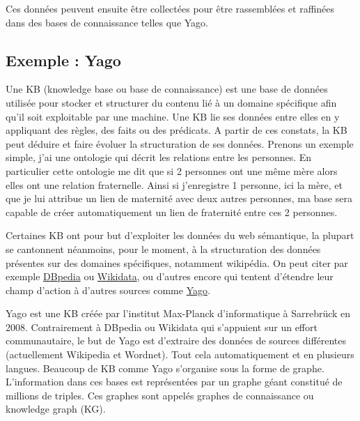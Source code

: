 Ces données peuvent ensuite être collectées pour être rassemblées et raffinées dans des bases de connaissance telles que Yago.

\subsection{Exemple : Yago}

Une KB (knowledge base ou base de connaissance) est une base de données utilisée pour stocker et structurer du contenu lié à un domaine spécifique afin qu'il soit exploitable par une machine. Une KB lie ses données entre elles en y appliquant des règles, des faits ou des prédicats. A partir de ces constats, la KB peut déduire et faire évoluer la structuration de ses données. Prenons un exemple simple, j'ai une ontologie qui décrit les relations entre les personnes. En particulier cette ontologie me dit que si 2 personnes ont une même mère alors elles ont une relation fraternelle. Ainsi si j'enregistre 1 personne, ici la mère, et que je lui attribue un lien de maternité avec deux autres personnes, ma base sera capable de créer automatiquement un lien de fraternité entre ces 2 personnes.

Certaines KB ont pour but d'exploiter les données du web sémantique, la plupart se cantonnent néanmoins, pour le moment, à la structuration des données présentes sur des domaines spécifiques, notamment wikipédia. On peut citer par exemple \href{http://wiki.dbpedia.org/about}{DBpedia} ou \href{https://www.wikidata.org/wiki/Wikidata:Main_Page}{Wikidata}, ou d'autres encore qui tentent d'étendre leur champ d'action à d'autres sources comme \href{http://www.mpi-inf.mpg.de/departments/databases-and-information-systems/research/yago-naga/yago/}{Yago}.

Yago est une KB créée par l'institut Max-Planck d'informatique à Sarrebrück en 2008. Contrairement à DBpedia ou Wikidata qui s'appuient sur un effort communautaire, le but de Yago est d'extraire des données de sources différentes (actuellement Wikipedia et Wordnet). Tout cela automatiquement et en plusieurs langues. Beaucoup de KB comme Yago s'organise sous la forme de graphe. L'information dans ces bases est représentées par un graphe géant constitué de millions de triples. Ces graphes sont appelés graphes de connaissance ou knowledge graph (KG).

